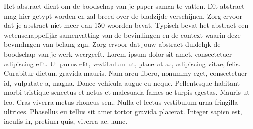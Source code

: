 Het abstract dient om de boodschap van je paper samen te vatten. 
Dit abstract mag hier getypt worden en zal breed over de bladzijde verschijnen. 
Zorg ervoor dat je abstract niet meer dan 150 woorden bevat. 
Typisch bevat het abstract een wetenschappelijke samenvatting van de bevindingen en de context waarin deze bevindingen van belang zijn.
Zorg ervoor dat jouw abstract duidelijk de boodschap van je werk weergeeft. 
Lorem ipsum dolor sit amet, consectetuer adipiscing elit. 
Ut purus elit, vestibulum ut, placerat ac, adipiscing vitae, felis.
Curabitur dictum gravida mauris. Nam arcu libero, nonummy eget, consectetuer id, vulputate a, magna. 
Donec vehicula augue eu neque. Pellentesque habitant morbi tristique senectus et netus et malesuada fames ac turpis egestas. Mauris ut leo.
Cras viverra metus rhoncus sem. Nulla et lectus vestibulum urna fringilla ultrices. Phasellus eu tellus sit amet tortor gravida placerat. 
Integer sapien est, iaculis in, pretium quis, viverra ac. nunc.
